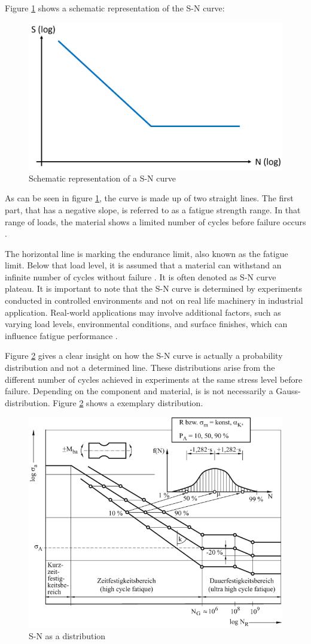Figure \ref{fig:WO} shows a schematic representation of the S-N curve: 

\begin{figure}[H]
	\centering
	\includegraphics[width=0.6\linewidth]{IMGs/WO.png}
	\caption{Schematic representation of a S-N curve}
	\label{fig:WO}
\end{figure}

As can be seen in figure \ref{fig:WO}, the curve is made up of two straight lines. The first part, that has a negative slope, is referred to as a fatigue strength range. In that range of loads, the material shows a limited number of cycles before failure occurs \cite{Adasooriya}.

The horizontal line is marking the endurance limit, also known as the fatigue limit. Below that load level, it is assumed that a material can withstand an infinite number of cycles without failure \cite{Bellows}. It is often denoted as S-N curve plateau.
It is important to note that the S-N curve is determined by experiments conducted in controlled environments and not on real life machinery in industrial application. Real-world applications may involve additional factors, such as varying load levels, environmental conditions, and surface finishes, which can influence fatigue performance \cite{JanOveHolmen}. 

Figure \ref{fig:WO2} gives a clear insight on how the S-N curve is actually a probability distribution and not a determined line. These distributions arise from the different number of cycles achieved in experiments at the same stress level before failure. Depending on the component and material, is is not necessarily a Gauss-distribution. Figure \ref{fig:WO2} shows a exemplary distribution.
\begin{figure}[H]
	\centering
	\includegraphics[width=0.7\linewidth]{IMGs/WO2.png}
	\caption{S-N as a distribution \cite{Klein}}
	\label{fig:WO2}
\end{figure}

